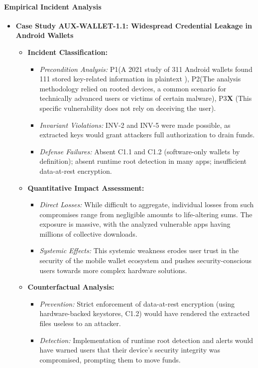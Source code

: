 \paragraph{Empirical Incident Analysis}

\begin{itemize}
    \item \textbf{Case Study AUX-WALLET-1.1: Widespread Credential Leakage in Android Wallets}
    \begin{itemize}
        \item \textbf{Incident Classification:}
            \begin{itemize}
                \item \textit{Precondition Analysis:} P1\checkmark (A 2021 study of 311 Android wallets found 111 stored key-related information in plaintext \cite{houy2023}), P2\checkmark (The analysis methodology relied on rooted devices, a common scenario for technically advanced users or victims of certain malware), P3\textbf{X} (This specific vulnerability does not rely on deceiving the user).
                \item \textit{Invariant Violations:} INV-2 and INV-5 were made possible, as extracted keys would grant attackers full authorization to drain funds.
                \item \textit{Defense Failures:} Absent C1.1 and C1.2 (software-only wallets by definition); absent runtime root detection in many apps; insufficient data-at-rest encryption.
            \end{itemize}
        \item \textbf{Quantitative Impact Assessment:}
            \begin{itemize}
                \item \textit{Direct Losses:} While difficult to aggregate, individual losses from such compromises range from negligible amounts to life-altering sums. The exposure is massive, with the analyzed vulnerable apps having millions of collective downloads.
                \item \textit{Systemic Effects:} This systemic weakness erodes user trust in the security of the mobile wallet ecosystem and pushes security-conscious users towards more complex hardware solutions.
            \end{itemize}
        \item \textbf{Counterfactual Analysis:}
            \begin{itemize}
                \item \textit{Prevention:} Strict enforcement of data-at-rest encryption (using hardware-backed keystores, C1.2) would have rendered the extracted files useless to an attacker.
                \item \textit{Detection:} Implementation of runtime root detection and alerts would have warned users that their device's security integrity was compromised, prompting them to move funds.
            \end{itemize}
    \end{itemize}
\end{itemize}


